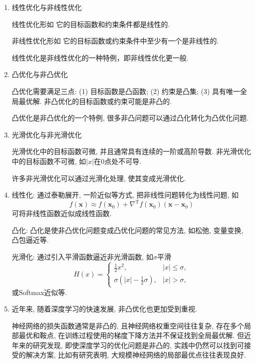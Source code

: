 \begin{enumerate}
    \item
        线性优化与非线性优化

        线性优化形如
        它的目标函数和约束条件都是线性的.

        非线性优化形如
        它的目标函数或约束条件中至少有一个是非线性的.

        线性优化是非线性优化的一种特例，即非线性优化更一般.
    
    \item
        凸优化与非凸优化

        凸优化需要满足三点: (1) 目标函数是凸函数; (2) 约束是凸集; (3) 具有唯一全局最优解.
        非凸优化的目标函数或约束可能是非凸的.

        凸优化是非凸优化的一个特例, 很多非凸问题可以通过凸化转化为凸优化问题.

    \item
        光滑优化与非光滑优化

        光滑优化中的目标函数可微, 并且通常具有连续的一阶或高阶导数.
        非光滑优化中的目标函数不可微, 如$|x|$在0点处不可导.

        许多非光滑优化可以通过光滑化处理, 使其变成光滑优化.

    \item
        线性化: 通过泰勒展开, 一阶近似等方式, 把非线性问题转化为线性问题, 如
        \begin{equation*}
            f(\bm{x})\approx f(\bm{x}_0)+\nabla^\mathrm{T} f(\bm{x}_0)(\bm{x}-\bm{x}_0)
        \end{equation*}
        可将非线性函数近似成线性函数.

        凸化: 凸化是使非凸优化问题变成凸优化问题的常见方法, 如松弛, 变量变换, 凸包逼近等.

        光滑化: 通过引入平滑函数逼近非光滑函数, 如$\sigma$平滑
        \begin{equation*}
            H(x)=
            \begin{cases}
                \frac{1}{2}x^2, & |x|\leq\sigma, \\
                \sigma\left(|x|-\frac{1}{2}\sigma\right), & |x|>\sigma,
            \end{cases}
        \end{equation*}
        或Softmax近似等.

    \item
        近年来, 随着深度学习的快速发展, 非凸优化也更加受到重视.

        神经网络的损失函数通常是非凸的, 且神经网络权重空间往往复杂, 存在多个局部最优和鞍点, 在训练过程使用的梯度下降方法并不保证找到全局最优解.
        但近年来的研究发现, 即使深度学习的优化问题是非凸的, 实践中仍然可以找到可接受的解决方案, 比如有研究表明, 大规模神经网络的局部最优点往往表现良好.
\end{enumerate}

